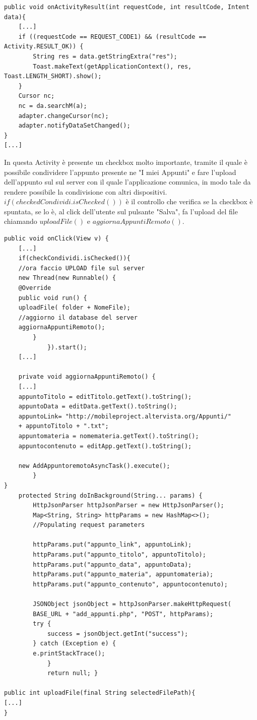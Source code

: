 \documentclass[a4paper, 50pt, twoside]{article}
\begin{document}
\begin{lstlisting}
public void onActivityResult(int requestCode, int resultCode, Intent data){
	[...]
	if ((requestCode == REQUEST_CODE1) && (resultCode == Activity.RESULT_OK)) {
		String res = data.getStringExtra("res");
		Toast.makeText(getApplicationContext(), res, Toast.LENGTH_SHORT).show();
	}
	Cursor nc;
	nc = da.searchM(a);
	adapter.changeCursor(nc);
	adapter.notifyDataSetChanged();
}
[...]
\end{lstlisting}
In questa Activity è presente un checkbox molto importante, tramite il quale è possibile condividere l'appunto presente ne "I miei Appunti" e fare l'upload dell'appunto sul sul server con il quale l'applicazione comunica, in modo tale da rendere possibile la condivisione con altri dispositivi.
$if(checkedCondividi.isChecked())$ è il controllo che verifica se la checkbox è spuntata, se lo è, al click dell'utente sul pulsante "Salva", fa l'upload del file chiamando $uploadFile()$ e $aggiornaAppuntiRemoto()$.

\begin{lstlisting}
public void onClick(View v) {
	[...]
	if(checkCondividi.isChecked()){
	//ora faccio UPLOAD file sul server
	new Thread(new Runnable() {
	@Override
	public void run() {
	uploadFile( folder + NomeFile);
	//aggiorno il database del server
	aggiornaAppuntiRemoto();
   	 	}
    		}).start();
   	[...]

	private void aggiornaAppuntiRemoto() {
	[...]
	appuntoTitolo = editTitolo.getText().toString();
	appuntoData = editData.getText().toString();
	appuntoLink= "http://mobileproject.altervista.org/Appunti/" 
	+ appuntoTitolo + ".txt";
	appuntomateria = nomemateria.getText().toString();
	appuntocontenuto = editApp.getText().toString();

	new AddAppuntoremotoAsyncTask().execute();
        } 
}
	protected String doInBackground(String... params) {
		HttpJsonParser httpJsonParser = new HttpJsonParser();
		Map<String, String> httpParams = new HashMap<>();
		//Populating request parameters

		httpParams.put("appunto_link", appuntoLink);
		httpParams.put("appunto_titolo", appuntoTitolo);
		httpParams.put("appunto_data", appuntoData);
		httpParams.put("appunto_materia", appuntomateria);
		httpParams.put("appunto_contenuto", appuntocontenuto);

		JSONObject jsonObject = httpJsonParser.makeHttpRequest(
		BASE_URL + "add_appunti.php", "POST", httpParams);
		try {
			success = jsonObject.getInt("success");
		} catch (Exception e) {
		e.printStackTrace();
            }
            return null; }

public int uploadFile(final String selectedFilePath){
[...]
}

\end{lstlisting}
\end{document}
